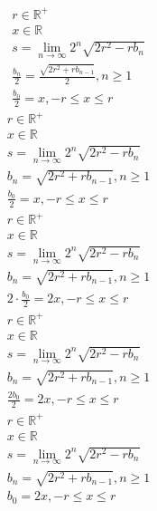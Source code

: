 \documentclass[a4paper,12pt]{report}
\begin{document}
\begin{subequations}
\begin{gather}
r \in \mathbb{R}^+ \\
x \in \mathbb{R} \\
s = \lim \limits_{n \to \infty} 2^n \sqrt{2r^2 - rb_n} \\
\frac{b_n}{2} = \frac{\sqrt{2r^2 + rb_{n-1}}}{2}, n \geq 1 \\
\frac{b_0}{2} = x, -r \leq x \leq r
\end{gather}
\end{subequations}
\begin{subequations}
\begin{gather}
r \in \mathbb{R}^+ \\
x \in \mathbb{R} \\
s = \lim \limits_{n \to \infty} 2^n \sqrt{2r^2 - rb_n} \\
b_n = \sqrt{2r^2 + rb_{n-1}}, n \geq 1 \\
\frac{b_0}{2} = x, -r \leq x \leq r
\end{gather}
\end{subequations}
\begin{subequations}
\begin{gather}
r \in \mathbb{R}^+ \\
x \in \mathbb{R} \\
s = \lim \limits_{n \to \infty} 2^n \sqrt{2r^2 - rb_n} \\
b_n = \sqrt{2r^2 + rb_{n-1}}, n \geq 1 \\
2 \cdot \frac{b_0}{2} = 2x, -r \leq x \leq r
\end{gather}
\end{subequations}
\begin{subequations}
\begin{gather}
r \in \mathbb{R}^+ \\
x \in \mathbb{R} \\
s = \lim \limits_{n \to \infty} 2^n \sqrt{2r^2 - rb_n} \\
b_n = \sqrt{2r^2 + rb_{n-1}}, n \geq 1 \\
\frac{2b_0}{2} = 2x, -r \leq x \leq r
\end{gather}
\end{subequations}
\begin{subequations}
\begin{gather}
r \in \mathbb{R}^+ \\
x \in \mathbb{R} \\
s = \lim \limits_{n \to \infty} 2^n \sqrt{2r^2 - rb_n} \\
b_n = \sqrt{2r^2 + rb_{n-1}}, n \geq 1 \\
b_0 = 2x, -r \leq x \leq r
\end{gather}
\end{subequations}
\end{document}
